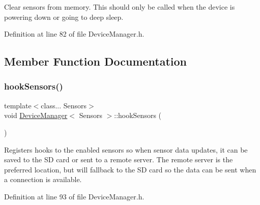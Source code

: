 Clear sensors from memory. This should only be called when the device is powering down or going to deep sleep. 

Definition at line 82 of file Device\+Manager.\+h.


\begin{DoxyCode}{0}

\end{DoxyCode}


\subsection{Member Function Documentation}
\mbox{\label{classDeviceManager_a73b4335c01ea2cea4981fec5f46d3406}} 
\subsubsection{\texorpdfstring{hookSensors()}{hookSensors()}}
{\footnotesize\ttfamily template$<$class... Sensors$>$ \\
void \mbox{\hyperlink{classDeviceManager}{Device\+Manager}}$<$ Sensors $>$\+::hook\+Sensors (\begin{DoxyParamCaption}{ }\end{DoxyParamCaption})\hspace{0.3cm}{\ttfamily [inline]}}

Registers hooks to the enabled sensors so when sensor data updates, it can be saved to the SD card or sent to a remote server. The remote server is the preferred location, but will fallback to the SD card so the data can be sent when a connection is available. 

Definition at line 93 of file Device\+Manager.\+h.


